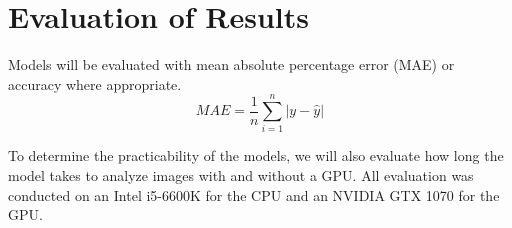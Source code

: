\chapter{Evaluation of Results}


Models will be evaluated with mean absolute percentage error (MAE) or accuracy where appropriate.
\begin{equation} MAE = \frac{1}{n} \sum_{i=1}^{n} |y-\hat{y}| \end{equation}

To determine the practicability of the models, we will also evaluate how long the model takes to analyze images with and without a GPU. All evaluation was conducted on an Intel i5-6600K for the CPU and an NVIDIA GTX 1070 for the GPU.